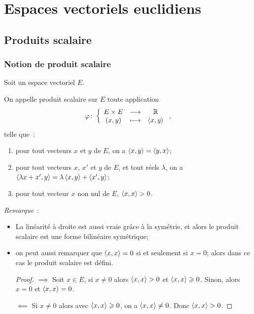 \chapter{Espaces vectoriels euclidiens}\label{chap:espaceseuclidiens}
\minitoc%
\minilof%
\minilot%

\section{Produits scalaire}

\subsection{Notion de produit scalaire}

Soit un espace vectoriel \(E\).
\begin{defdef}
  On appelle produit scalaire sur \(E\) toute application
  \begin{equation}
    \varphi\colon\left\{\begin{array}{ccc}E \times E & \longrightarrow &\mathbb{R}\\(x,y) & \longmapsto & \left\langle{x},{y}\right\rangle\end{array}\right.,
  \end{equation}
  telle que~:
  \begin{enumerate}
    \item pour tout vecteurs \(x\) et \(y\) de \(E\), on a \(\left\langle{x},{y}\right\rangle=\left\langle{y},{x}\right\rangle\);
    \item pour tout vecteurs \(x\), \(x'\) et \(y\) de \(E\), et tout réels \(\lambda\), on a \(\left\langle{\lambda x +x'},{y}\right\rangle = \lambda\left\langle{x},{y}\right\rangle + \left\langle{x'},{y}\right\rangle\);
    \item pour tout vecteur \(x\) non nul de \(E\), \(\left\langle{x},{x}\right\rangle>0\).
  \end{enumerate}
\end{defdef}
\emph{Remarque}~:
\begin{itemize}
  \item La linéarité à droite est aussi vraie grâce à la symétrie, et alors le produit scalaire est une forme bilinéaire symétrique;
  \item on peut aussi remarquer que \(\left\langle{x},{x}\right\rangle=0\) si et seulement si \(x=0\); alors dans ce cas le produit scalaire est défini.
    \begin{proof}
      \(\implies\) Soit \(x \in E\), si \(x\neq 0\) alors \(\left\langle{x},{x}\right\rangle>0\) et \(\left\langle{x},{x}\right\rangle\geqslant 0\). Sinon, alors \(x=0\) et \(\left\langle{x},{x}\right\rangle=0\).

      \(\impliedby\) Si \(x \neq 0\) alors avec \(\left\langle{x},{x}\right\rangle\geqslant 0\), on a \(\left\langle{x},{x}\right\rangle \neq 0\). Donc \(\left\langle{x},{x}\right\rangle>0\).
    \end{proof}
\end{itemize}

